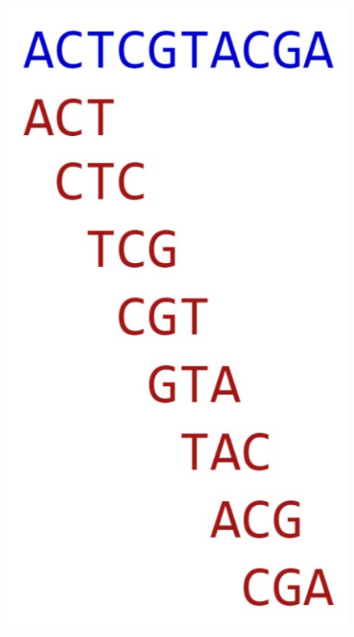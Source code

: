 \documentclass[letterpaper, 10 pt]{ieeeconf}
\begin{document}
  \begin{figure}[thpb]
    \centering
    \includegraphics[scale=0.4]{images/fig2-1.jpg}

\end{figure}
\end{document}
